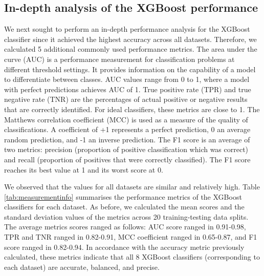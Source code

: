 \subsection{In-depth analysis of the XGBoost performance}
We next sought to perform an in-depth performance analysis for the XGBoost classifier since it achieved the highest accuracy across all datasets. Therefore, we calculated 5 additional commonly used performance metrics. 
The area under the curve (AUC) is a performance measurement for classification problems at different threshold settings. It provides information on the capability of a model to differentiate between classes. AUC values range from 0 to 1, where a model with perfect predictions achieves AUC of 1. 
True positive rate (TPR) and true negative rate (TNR) are the percentages of actual positive or negative results that are correctly identified.  For ideal classifiers, these metrics are close to 1. The Matthews correlation coefficient (MCC) is used as a measure of the quality of classifications. A coefficient of +1 represents a perfect prediction, 0 an average random prediction, and -1 an inverse prediction. 
The F1 score is an average of two metrics: precision (proportion of positive classification which was correct) and recall (proportion of positives that were correctly classified). The F1 score reaches its best value at 1 and its worst score at 0. 

We observed that the values for all datasets are similar and relatively high. Table \ref{tab:measurementinfo} summarises the performance metrics of the XGBoost classifiers for each dataset. As before, we calculated the mean scores and the standard deviation values of the metrics across 20 training-testing data splits. The average metrics scores ranged as follows: AUC score ranged in 0.91-0.98, TPR and TNR ranged in 0.82-0.91, MCC coefficient ranged in 0.65-0.87, and F1 score ranged in 0.82-0.94. In accordance with the accuracy metric previously calculated, these metrics indicate that all 8 XGBoost classifiers (corresponding to each dataset) are accurate, balanced, and precise. 


